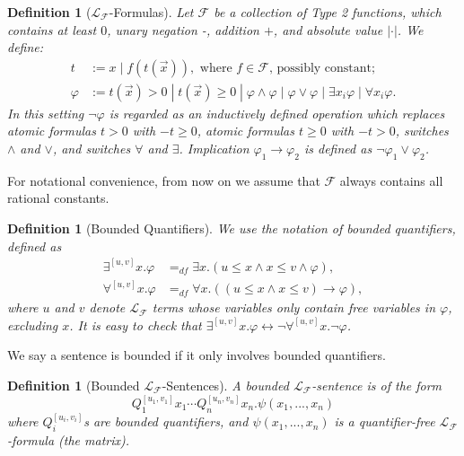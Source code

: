 \documentclass[conference]{IEEEtran}
\newtheorem{definition}[theorem]{Definition}
\begin{document}
\begin{definition}[$\mathcal{L}_{\mathcal{F}}$-Formulas]
Let $\mathcal{F}$ be a collection of Type 2 functions, which contains at least $0$, unary negation -, addition $+$, and absolute value $|\cdot|$. We define:
\begin{align*}
t& := x \; | \; f(t(\vec x)), \mbox{ where }f\in \mathcal{F}\mbox{, possibly constant};\\
\varphi& := t(\vec x)> 0 \; | \; t(\vec x)\geq 0 \; | \; \varphi\wedge\varphi \; | \; \varphi\vee\varphi \; | \; \exists x_i\varphi \; |\; \forall x_i\varphi.
\end{align*}
In this setting $\neg\varphi$ is regarded as an inductively defined operation which replaces atomic formulas $t>0$ with $-t\geq 0$, atomic formulas $t\geq 0$ with $-t>0$, switches $\wedge$ and $\vee$, and switches $\forall$ and $\exists$. Implication $\varphi_1\rightarrow\varphi_2$ is defined as $\neg\varphi_1\vee\varphi_2$.
\end{definition}

For notational convenience, from now on we assume that $\mathcal{F}$ always contains all rational constants. 

\begin{definition}[Bounded Quantifiers]
We use the notation of {\em bounded quantifiers}, defined as
\begin{align*}
\exists^{[u,v]}x.\varphi &=_{df}\exists x. ( u \leq x \land x \leq v \wedge \varphi),\\
\forall^{[u,v]}x.\varphi &=_{df} \forall x. ( (u \leq x \land x \leq v) \rightarrow \varphi),
\end{align*}
where $u$ and $v$ denote $\mathcal{L}_{\mathcal{F}}$ terms whose variables only contain free variables in $\varphi$, excluding $x$. It is easy to check that $\exists^{[u,v]}x. \varphi \leftrightarrow \neg \forall^{[u,v]}x. \neg\varphi$. 
\end{definition}

We say a sentence is bounded if it only involves bounded quantifiers. 

\begin{definition}[Bounded $\mathcal{L}_{\mathcal{F}}$-Sentences]
A {\em bounded $\mathcal{L}_{\mathcal{F}}$-sentence} is of the form
$$Q_1^{[u_1,v_1]}x_1\cdots Q_n^{[u_n,v_n]}x_n. \psi(x_1,...,x_n)$$
where $Q_i^{[u_i,v_i]}$s are bounded quantifiers, and $\psi(x_1,...,x_n)$ is a quantifier-free $\mathcal{L}_{\mathcal{F}}$-formula (the matrix). 
\end{definition}
\end{document}
